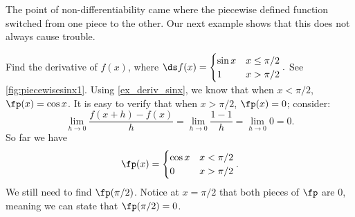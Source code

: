 The point of non-differentiability came where the piecewise defined function switched from one piece to the other. Our next example shows that this does not always cause trouble.\bigskip

\begin{example}\label{ex_diff_piecewise}
Find the derivative of $f(x)$, where $\ds f(x) = \begin{cases}\sin x & x\leq \pi/2 \\ 1 & x>\pi/2 \end{cases}.$ See \autoref{fig:piecewisesinx1}.
\solution
Using \autoref{ex_deriv_sinx}, we know that when $x<\pi/2$, $\fp(x) = \cos x$. It is easy to verify that when $x>\pi/2$, $\fp(x) = 0$; consider:
%
%
\[
 \lim_{h\to0}\frac{f(x+h) - f(x)}{h}
 = \lim_{h\to0}\frac{1-1}{h} = \lim_{h\to0}0 =0.
\]
%
So far we have
\[\fp(x) = \begin{cases}\cos x & x<\pi/2\\ 0 & x>\pi/2\end{cases}.\]
We still need to find $\fp(\pi/2)$. Notice at $x=\pi/2$ that both pieces of $\fp$ are 0, meaning we can state that $\fp(\pi/2)=0$. 


\end{example}

